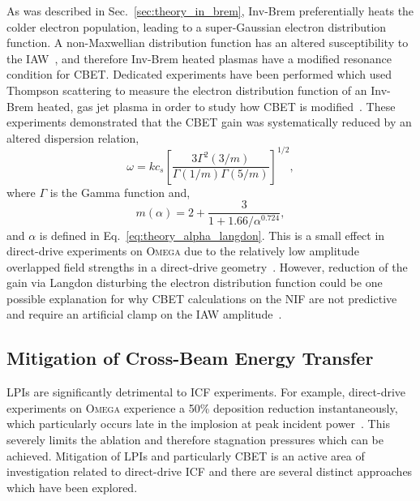 As was described in Sec.~\ref{sec:theory_in_brem}, \ac{Inv-Brem} preferentially heats the colder electron population, leading to a super-Gaussian electron distribution function.
A non-Maxwellian distribution function has an altered susceptibility to the \ac{IAW}~\cite{afeyan_kinetic_1998}, and therefore \ac{Inv-Brem} heated plasmas have a modified resonance condition for \ac{CBET}.
Dedicated experiments have been performed which used Thompson scattering to measure the electron distribution function of an \ac{Inv-Brem} heated, gas jet plasma  in order to study how \ac{CBET} is modified~\cite{turnbull_impact_2020}.
These experiments demonstrated that the \ac{CBET} gain was systematically reduced by an altered dispersion relation,
\begin{equation}
    \omega = k c_s \left[ \frac{3 \Gamma^2(3/m)}{\Gamma(1/m)\Gamma(5/m)} \right]^{1/2},
\end{equation}
where $\Gamma$ is the Gamma function and,
\begin{equation}
    m(\alpha) = 2 + \frac{3}{1 + 1.66/\alpha^{0.724}},
\end{equation}
and $\alpha$ is defined in Eq.~\ref{eq:theory_alpha_langdon}.
This is a small effect in direct-drive experiments on \textsc{Omega} due to the relatively low amplitude overlapped field strengths in a direct-drive geometry~\cite{colaitis_inverse_2021}.
However, reduction of the gain via Langdon disturbing the electron distribution function could be one possible explanation for why \ac{CBET} calculations on the \ac{NIF} are not predictive and require an artificial clamp on the \ac{IAW} amplitude~\cite{michel_stochastic_2012,kritcher_energy_2018}.

\subsection{Mitigation of Cross-Beam Energy Transfer}%
\label{sec:theory_lpi_mitigation}

\ac{LPIs} are significantly detrimental to \ac{ICF} experiments.
For example, direct-drive experiments on \textsc{Omega} experience a 50\% deposition reduction instantaneously, which particularly occurs late in the implosion at peak incident power~\cite{colaitis_inverse_2021}.
This severely limits the ablation and therefore stagnation pressures which can be achieved.
Mitigation of \ac{LPIs} and particularly \ac{CBET} is an active area of investigation related to direct-drive \ac{ICF} and there are several distinct approaches which have been explored.

